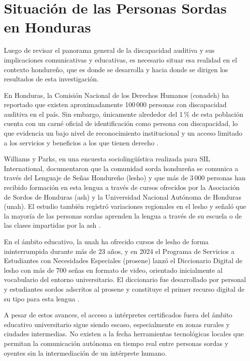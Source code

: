 \section{Situación de las Personas Sordas en Honduras}

Luego de revisar el panorama general de la discapacidad auditiva y sus implicaciones
comunicativas y educativas, es necesario situar esa realidad en el contexto hondureño,
que es donde se desarrolla y hacia donde se dirigen los resultados de esta investigación.

En Honduras, la Comisión Nacional de los Derechos Humanos (\acrshort{conadeh}) ha reportado
que existen aproximadamente 100\,000 personas con discapacidad auditiva en el país. Sin
embargo, únicamente alrededor del 1\,\% de esta población cuenta con un carné oficial de
identificación como persona con discapacidad, lo que evidencia un bajo nivel de
reconocimiento institucional y un acceso limitado a los servicios y beneficios a los que
tienen derecho \cite{conadeh_discriminados}.

Williams y Parks, en una encuesta sociolingüística realizada para SIL International,
documentaron que la comunidad sorda hondureña se comunica a través del Lenguaje de
Señas Hondureño (\acrshort{lesho}) y que más de 3\,000 personas han recibido formación en esta
lengua a través de cursos ofrecidos por la Asociación de Sordos de Honduras (\acrshort{ash}) y la
Universidad Nacional Autónoma de Honduras (\acrshort{unah}). El estudio también registró
variaciones regionales en el \acrshort{lesho} y señaló que la mayoría de las personas sordas
aprenden la lengua a través de su escuela o de las clases impartidas por la \acrshort{ash} \cite{williams_encuesta_2015}.

En el ámbito educativo, la \acrshort{unah} ha ofrecido cursos de \acrshort{lesho} de forma ininterrumpida
durante más de 23 años, y en 2024 el Programa de Servicios a Estudiantes con Necesidades
Especiales (\acrshort{prosene}) lanzó el Diccionario Digital de \acrshort{lesho} con más de 700 señas en
formato de video, orientado inicialmente al vocabulario del entorno universitario. El
diccionario fue desarrollado por personal y estudiantes sordos adscritos al \acrshort{prosene} y
constituye el primer recurso digital de su tipo para esta lengua \cite{unah_diccionario_2024}.

A pesar de estos avances, el acceso a intérpretes certificados fuera del ámbito educativo
universitario sigue siendo escaso, especialmente en zonas rurales y ciudades intermedias.
No existen a la fecha herramientas tecnológicas locales que permitan la comunicación
autónoma en tiempo real entre personas sordas y oyentes sin la intermediación de un
intérprete humano.
